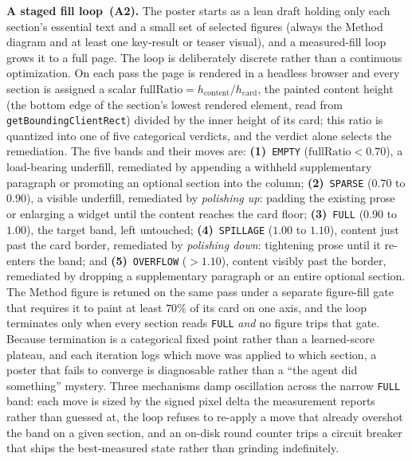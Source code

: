 \documentclass{article}
\begin{document}
\textbf{A staged fill loop~(A2).} The poster starts as a lean draft holding only each section's essential text and a small set of selected figures (always the Method diagram and at least one key-result or teaser visual), and a measured-fill loop grows it to a full page. The loop is deliberately discrete rather than a continuous optimization. On each pass the page is rendered in a headless browser and every section is assigned a scalar $\mathrm{fullRatio} = h_{\mathrm{content}}/h_{\mathrm{card}}$, the painted content height (the bottom edge of the section's lowest rendered element, read from \texttt{getBoundingClientRect}) divided by the inner height of its card; this ratio is quantized into one of five categorical verdicts, and the verdict alone selects the remediation. The five bands and their moves are: \textbf{(1)}~\texttt{EMPTY} ($\mathrm{fullRatio} < 0.70$), a load-bearing underfill, remediated by appending a withheld supplementary paragraph or promoting an optional section into the column; \textbf{(2)}~\texttt{SPARSE} ($0.70$ to $0.90$), a visible underfill, remediated by \emph{polishing up}: padding the existing prose or enlarging a widget until the content reaches the card floor; \textbf{(3)}~\texttt{FULL} ($0.90$ to $1.00$), the target band, left untouched; \textbf{(4)}~\texttt{SPILLAGE} ($1.00$ to $1.10$), content just past the card border, remediated by \emph{polishing down}: tightening prose until it re-enters the band; and \textbf{(5)}~\texttt{OVERFLOW} ($> 1.10$), content visibly past the border, remediated by dropping a supplementary paragraph or an entire optional section. The Method figure is retuned on the same pass under a separate figure-fill gate that requires it to paint at least $70\%$ of its card on one axis, and the loop terminates only when every section reads \texttt{FULL} \emph{and} no figure trips that gate. Because termination is a categorical fixed point rather than a learned-score plateau, and each iteration logs which move was applied to which section, a poster that fails to converge is diagnosable rather than a ``the agent did something'' mystery. Three mechanisms damp oscillation across the narrow \texttt{FULL} band: each move is sized by the signed pixel delta the measurement reports rather than guessed at, the loop refuses to re-apply a move that already overshot the band on a given section, and an on-disk round counter trips a circuit breaker that ships the best-measured state rather than grinding indefinitely.
\end{document}
